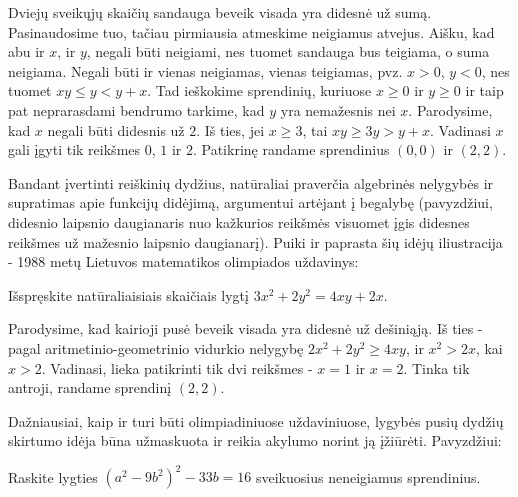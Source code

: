 \begin{sprendimas}
  Dviejų sveikųjų skaičių sandauga beveik visada yra didesnė už sumą.
  Pasinaudosime tuo, tačiau pirmiausia atmeskime neigiamus atvejus. Aišku,
  kad abu ir $x$, ir $y$, negali būti neigiami, nes tuomet sandauga bus
  teigiama, o suma neigiama. Negali būti ir vienas neigiamas, vienas
  teigiamas, pvz. $x>0$, $y<0$, nes tuomet $xy \leq y < y + x$. Tad ieškokime
  sprendinių, kuriuose $x\geq 0$ ir $y\geq 0$ ir taip pat neprarasdami
  bendrumo tarkime, kad $y$ yra nemažesnis nei $x$. Parodysime, kad
  $x$ negali būti didesnis už $2$. Iš ties, jei $x\geq 3$, tai $xy \geq 3y >
  y + x$. Vadinasi $x$ gali įgyti tik reikšmes $0$, $1$ ir $2$. Patikrinę
  randame sprendinius $(0,0)$ ir $(2,2)$.
\end{sprendimas}

Bandant įvertinti reiškinių dydžius, natūraliai praverčia algebrinės
nelygybės ir supratimas apie funkcijų didėjimą, argumentui artėjant į
begalybę (pavyzdžiui, didesnio laipsnio daugianaris nuo kažkurios reikšmės
visuomet įgis didesnes reikšmes už mažesnio laipsnio daugianarį). Puiki ir
paprasta šių idėjų iliustracija - 1988 metų Lietuvos matematikos olimpiados
uždavinys:
\begin{pav} \text{\emph{[LitMo 1988]}} Išspręskite natūraliaisiais skaičiais lygtį
  $3x^2 + 2y^2 = 4xy + 2x.$
\end{pav}
\begin{sprendimas}
  Parodysime, kad kairioji pusė beveik visada yra didesnė už dešiniąją. Iš
  ties - pagal aritmetinio-geometrinio vidurkio nelygybę $2x^2 +
  2y^2 \geq 4xy$, ir $x^2 > 2x$, kai $x>2$. Vadinasi, lieka patikrinti tik
  dvi reikšmes - $x=1$ ir $x=2$. Tinka tik antroji, randame sprendinį
  $(2,2)$.
\end{sprendimas}

Dažniausiai, kaip ir turi būti olimpiadiniuose uždaviniuose, lygybės pusių
dydžių skirtumo idėja būna užmaskuota ir reikia akylumo norint ją įžiūrėti.
Pavyzdžiui:

\begin{pav} \text{\emph{[LitKo 2009]}} Raskite lygties
  $(a^2 - 9b^2)^2 - 33b = 16$ sveikuosius neneigiamus sprendinius.
\end{pav}

